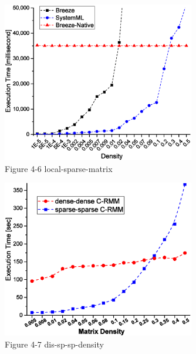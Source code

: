 \documentclass[onecolumn]{ieeetran}
\begin{document}
\begin{figure}[ht]
  \centering\captionsetup{justification=centering}
  \includegraphics[width=0.75\textwidth]{Figure_4-6_local-sparse-dense-matrix.eps}
  \caption{Figure 4-6 local-sparse-matrix}\label{Figure_4-6_local-sparse-matrix}
\end{figure}

\begin{figure}[ht]
  \centering\captionsetup{justification=centering}
  \includegraphics[width=0.75\textwidth]{Figure_4-7_dis-sp-sp-density.eps}
  \caption{Figure 4-7 dis-sp-sp-density}\label{Figure_4-7_dis-sp-sp-density}
\end{figure}
\end{document}
